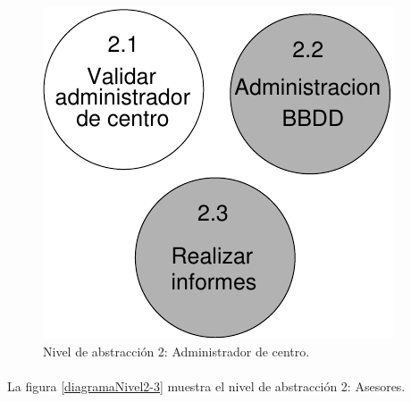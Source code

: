         \begin{figure}[!ht]
            \begin{center}
            \includegraphics[]{08.Analisis_Funcional/8.2.DFDs/Niveles/Diagramas/nivel2-2.pdf}
            \caption{Nivel de abstracción 2: Administrador de centro.}
            \label{diagramaNivel2-2}
            \end{center}
         \end{figure}

  \paragraph{}La figura \ref{diagramaNivel2-3} muestra el nivel de abstracción
  2: Asesores.

